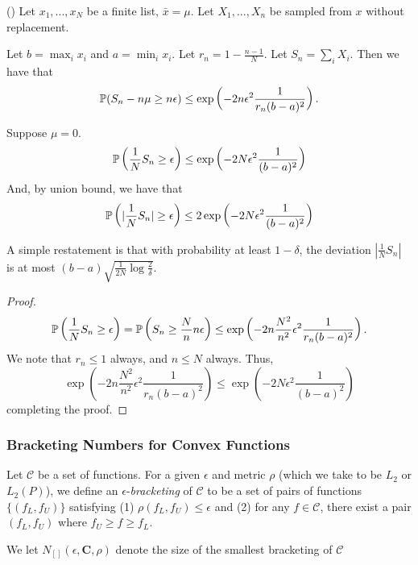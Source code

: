 \documentclass[12pt,pdftex,aos,noinfoline,addressasfootnote]{imsart}
\begin{document}
\begin{lemma} (\cite{serfling1974probability}) 
Let $x_1,..., x_N$ be a finite list, $\bar{x} = \mu$. Let $X_1,...,X_n$ be sampled from $x$ without replacement. 

Let $b = \max_i x_i$ and $a = \min_i x_i$. Let $r_n = 1- \frac{n-1}{N}$. Let $S_n = \sum_i X_i$.
Then we have that
\[
\P( S_n - n \mu \geq n \epsilon) \leq \exp\left( - 2 n \epsilon^2 \frac{1}{r_n (b-a)^2}\right).
\]
\end{lemma}

\begin{corollary}
\label{cor:serfling}
Suppose $\mu = 0$. 
\[
\P\left( \frac{1}{N} S_n \geq \epsilon\right) \leq \exp\left( -2 N \epsilon^2 \frac{1}{(b-a)^2}\right)
\]
And, by union bound, we have that
\[
\P\left( | \frac{1}{N} S_n| \geq \epsilon\right) \leq 2 \exp\left( -2 N \epsilon^2 \frac{1}{(b-a)^2}\right)
\]

\end{corollary}

A simple restatement is that with probability at least $1- \delta$, the deviation $| \frac{1}{N} S_n|$ is at most $ (b-a) \sqrt{ \frac{1}{2N} \log \frac{2}{\delta}}$.

\begin{proof}
\[
\P\left( \frac{1}{N} S_n \geq \epsilon\right) = \P\left( S_n \geq \frac{N}{n} n \epsilon\right) \leq \exp\left( - 2 n \frac{N^2}{n^2} \epsilon^2 \frac{1}{r_n (b-a)^2} \right).
\]
We note that $r_n \leq 1$ always, and $n \leq N$ always.   Thus,
\[
\exp\left( - 2 n \frac{N^2}{n^2} \epsilon^2 \frac{1}{r_n (b-a)^2} \right)  \leq \exp\left( - 2 N \epsilon^2 \frac{1}{(b-a)^2}\right)
\]
completing the proof.
\end{proof}

\subsubsection{Bracketing Numbers for Convex Functions}

\begin{definition}
Let $\mathcal{C}$ be a set of functions. For a given $\epsilon$ and metric $\rho$ (which we take to be $L_2$ or $L_2(P)$), we define an $\epsilon$-\textit{bracketing} of $\mathcal{C}$ to be a set of pairs of functions $\{ (f_L, f_U) \}$ satisfying (1) $\rho( f_L, f_U) \leq \epsilon$ and (2) for any $f \in \mathcal{C}$, there exist a pair $(f_L, f_U)$ where $f_U \geq f \geq f_L$. 

We let $N_{[]}(\epsilon, \mathbf{C}, \rho)$ denote the size of the smallest bracketing of $\mathcal{C}$
\end{definition}
\end{document}
